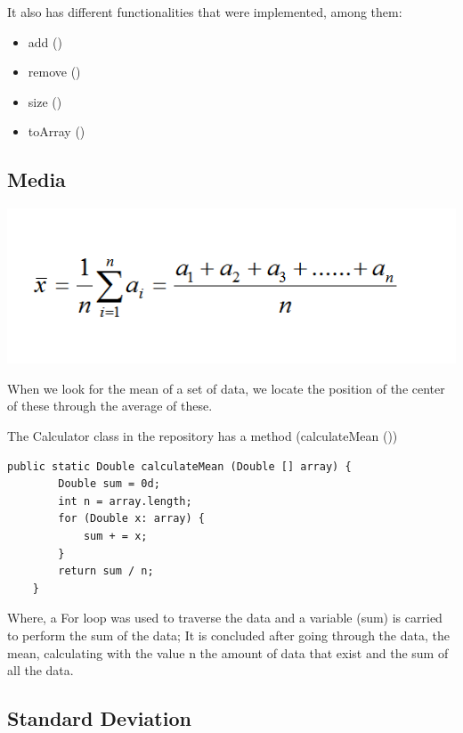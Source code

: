 \documentclass[
	12pt, %
]{fphw}
\begin{document}
It also has different functionalities that were implemented, among them:

\begin {itemize}
\item add ()
\item remove ()
\item size ()
\item toArray ()
\end {itemize}



\subsection * {Media}



\includegraphics [scale = 0.8] {formula-media.png}


When we look for the mean of a set of data, we locate the position of the center of these through the average of these.

The Calculator class in the repository has a method (calculateMean ())

\begin{verbatim}
public static Double calculateMean (Double [] array) {
        Double sum = 0d;
        int n = array.length;
        for (Double x: array) {
            sum + = x;
        }
        return sum / n;
    }
\end{verbatim}

Where, a For loop was used to traverse the data and a variable (sum) is carried to perform the sum of the data; It is concluded after going through the data, the mean, calculating with the value n the amount of data that exist and the sum of all the data.

\subsection * {Standard Deviation}
\end{document}
